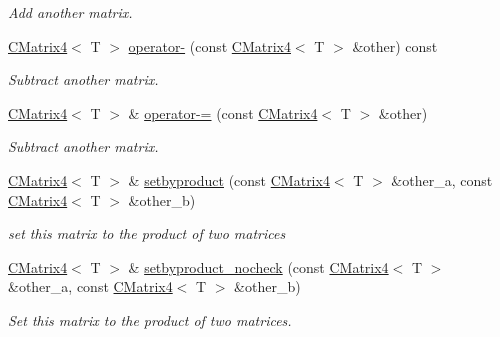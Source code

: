 \begin{DoxyCompactItemize}
\begin{DoxyCompactList}\small\item\em Add another matrix. \end{DoxyCompactList}\item 
\mbox{\label{classirr_1_1core_1_1CMatrix4_ab7a7ba0d368bd2de010cb33191492443}} 
\hyperlink{classirr_1_1core_1_1CMatrix4}{C\+Matrix4}$<$ T $>$ \hyperlink{classirr_1_1core_1_1CMatrix4_ab7a7ba0d368bd2de010cb33191492443}{operator-\/} (const \hyperlink{classirr_1_1core_1_1CMatrix4}{C\+Matrix4}$<$ T $>$ \&other) const
\begin{DoxyCompactList}\small\item\em Subtract another matrix. \end{DoxyCompactList}\item 
\mbox{\label{classirr_1_1core_1_1CMatrix4_a24eb7faa1418765ba87d3f02f27d643f}} 
\hyperlink{classirr_1_1core_1_1CMatrix4}{C\+Matrix4}$<$ T $>$ \& \hyperlink{classirr_1_1core_1_1CMatrix4_a24eb7faa1418765ba87d3f02f27d643f}{operator-\/=} (const \hyperlink{classirr_1_1core_1_1CMatrix4}{C\+Matrix4}$<$ T $>$ \&other)
\begin{DoxyCompactList}\small\item\em Subtract another matrix. \end{DoxyCompactList}\item 
\hyperlink{classirr_1_1core_1_1CMatrix4}{C\+Matrix4}$<$ T $>$ \& \hyperlink{classirr_1_1core_1_1CMatrix4_a8503c58913ba9407ba00b173d8a3e25c}{setbyproduct} (const \hyperlink{classirr_1_1core_1_1CMatrix4}{C\+Matrix4}$<$ T $>$ \&other\+\_\+a, const \hyperlink{classirr_1_1core_1_1CMatrix4}{C\+Matrix4}$<$ T $>$ \&other\+\_\+b)
\begin{DoxyCompactList}\small\item\em set this matrix to the product of two matrices \end{DoxyCompactList}\item 
\hyperlink{classirr_1_1core_1_1CMatrix4}{C\+Matrix4}$<$ T $>$ \& \hyperlink{classirr_1_1core_1_1CMatrix4_a526a2a11dcd8b18c9e77deb84094778d}{setbyproduct\+\_\+nocheck} (const \hyperlink{classirr_1_1core_1_1CMatrix4}{C\+Matrix4}$<$ T $>$ \&other\+\_\+a, const \hyperlink{classirr_1_1core_1_1CMatrix4}{C\+Matrix4}$<$ T $>$ \&other\+\_\+b)
\begin{DoxyCompactList}\small\item\em Set this matrix to the product of two matrices. \end{DoxyCompactList}\item 

\end{DoxyCompactItemize}
